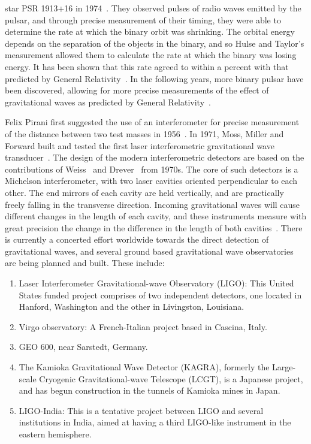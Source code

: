 star PSR 1913+16 in 1974~\cite{hulse}. They observed pulses of radio waves
emitted by the pulsar, and through precise measurement of their timing,
they were able to determine the rate at which the binary orbit was shrinking.
The orbital energy depends on the separation of the objects in 
the binary, and so Hulse and Taylor's
measurement allowed them to calculate the rate at which the binary 
was losing energy. It has been shown that this rate agreed to within a percent
with that predicted by General Relativity~\cite{Weisberg:1981mt,Taylor:1989}.
In the following years, more binary pulsar
have been discovered, allowing for more precise measurements of the effect
of gravitational waves as predicted by General Relativity~\cite{Burgay:2003jj}.



Felix Pirani first suggested the use of an interferometer for precise
measurement of the distance between two test masses in 1956~\cite{Pirani:1956}.
In 1971, Moss, Miller and Forward built and tested the first laser
interferometric gravitational wave transducer~\cite{Forward:1971}. The design
of the modern interferometric detectors are based on the contributions 
of Weiss~\cite{Weiss:1972} and Drever~\cite{Drever:1980} from 1970s. The
core of such detectors is a Michelson interferometer, with two laser 
cavities oriented perpendicular to each other. The end mirrors of each 
cavity are held vertically, and are practically freely falling in the 
transverse direction. Incoming gravitational waves will cause different 
changes in the length of each cavity, and these instruments measure with 
great precision the change in the difference in the length of both 
cavities~\cite{Saulson:1995zi}. 
%
There is currently a concerted effort worldwide towards the direct detection 
of gravitational waves, and several ground based gravitational wave observatories 
are being planned and built. These include:
%
\begin{enumerate}
 \item Laser Interferometer Gravitational-wave Observatory (LIGO): This
 United States funded project comprises of two independent detectors, one 
 located in Hanford, Washington and the other in Livingston, Louisiana. 
 \item Virgo observatory: A French-Italian project based in Cascina, Italy.
 \item GEO 600, near Sarstedt, Germany.
 \item The Kamioka Gravitational Wave Detector (KAGRA), formerly the Large-scale
 Cryogenic Gravitational-wave Telescope (LCGT), is a Japanese project, and has
 begun construction in the tunnels of Kamioka mines in Japan.  
 \item LIGO-India: This is a tentative project between LIGO and several 
 institutions in India, aimed at having a third LIGO-like instrument in the 
 eastern hemisphere.
\end{enumerate}
